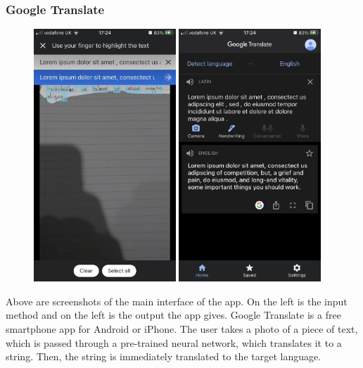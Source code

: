 \documentclass{report}
\begin{document}
\subsubsection{Google Translate}
\begin{figure}[H]
\centering
\includegraphics[width=2.1in]{Images/Google Translate/Character Recognition.png}
\includegraphics[width=2.1in]{Images/Google Translate/Main Tab.png}
\end{figure}
Above are screenshots of the main interface of the app. On the left is the input method and on the left is the output the app gives. 
\newline
Google Translate is a free smartphone app for Android or iPhone. The user takes a photo of a piece of text, which is passed through a pre-trained neural network, which translates it to a string. Then, the string is immediately translated to the target language. 
\end{document}
